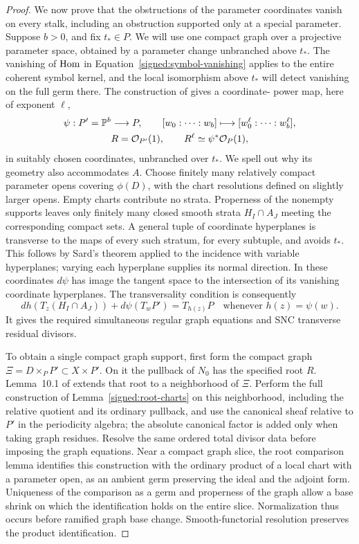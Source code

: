 \begin{proof}
We now prove that the obstructions of the parameter coordinates vanish on every
stalk, including an obstruction supported only at a special parameter.
Suppose \(b>0\), and fix \(t_*\in P\).  We will use one compact graph over
a projective parameter space, obtained by a parameter change unbranched
above \(t_*\).  The vanishing of
\(\operatorname{Hom}\) in Equation~\eqref{signed:symbol-vanishing} applies to the entire
coherent symbol kernel, and the local isomorphism
above \(t_*\) will detect vanishing on the full germ there.  The
construction of \cite[Proposition~10.5]{BL} gives a coordinate-
power map, here of exponent \(\ell\),
\[
\begin{gathered}
 \psi:P'=\mathbb P^b\longrightarrow P,\qquad
 [w_0:\cdots:w_b]\longmapsto[w_0^\ell:\cdots:w_b^\ell],\\
 R=\mathcal O_{P'}(1),\qquad R^\ell\simeq\psi^*\mathcal O_P(1),
\end{gathered}
\]
in suitably chosen coordinates, unbranched over \(t_*\).
We spell out why its geometry also accommodates \(A\).
Choose finitely many relatively compact parameter opens
covering \(\phi(D)\), with the chart resolutions defined on
slightly larger opens.  Empty charts contribute no strata.  Properness of
the nonempty supports leaves
only finitely many closed smooth strata \(H_I\cap A_J\) meeting
the corresponding compact sets.  A general tuple of coordinate
hyperplanes is transverse to the maps of every such stratum,
for every subtuple, and avoids \(t_*\).  This follows by Sard's
theorem applied to the incidence with variable hyperplanes;
varying each hyperplane supplies its normal direction.  In
these coordinates \(d\psi\) has image the tangent space to
the intersection of its vanishing coordinate hyperplanes.
The transversality condition is consequently
\[
 dh(T_z(H_I\cap A_J))+d\psi(T_wP')=T_{h(z)}P
 \quad\text{whenever }h(z)=\psi(w).
\]
It gives the required simultaneous regular graph equations
and SNC transverse residual divisors.

To obtain a single compact graph support, first form the compact
graph \(\Xi=D\times_P P'\subset X\times P'\).  On it the
pullback of \(N_0\) has the specified root \(R\).  Lemma~10.1
of \cite{BL} extends that root to a neighborhood of \(\Xi\).
Perform the full construction of Lemma~\ref{signed:root-charts}
on this neighborhood, including the relative quotient and its ordinary
pullback, and use the canonical sheaf relative to \(P'\) in the periodicity
algebra; the absolute canonical factor is added only when
taking graph residues.  Resolve the same ordered total divisor data before imposing
the graph equations.  Near a compact graph slice, the root
comparison lemma identifies this construction with the ordinary
product of a local chart with a parameter open, as an ambient
germ preserving the ideal and the adjoint form.  Uniqueness
of the comparison as a germ and properness of the graph allow
a base shrink on which the identification holds on the entire
slice.  Normalization thus occurs before ramified graph base
change.  Smooth-functorial resolution preserves the product
identification.


\end{proof}

